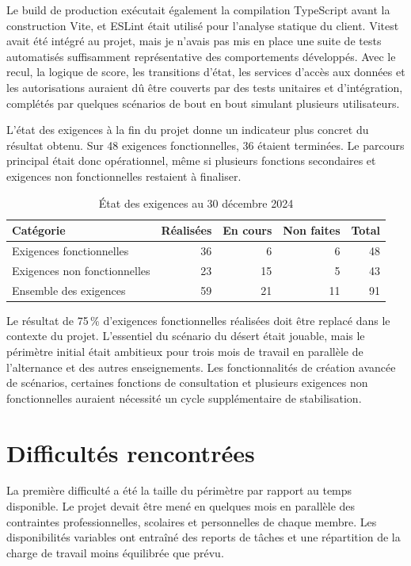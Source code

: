 Le build de production exécutait également la compilation TypeScript avant la construction Vite, et ESLint était utilisé pour l'analyse statique du client. Vitest avait été intégré au projet, mais je n'avais pas mis en place une suite de tests automatisés suffisamment représentative des comportements développés. Avec le recul, la logique de score, les transitions d'état, les services d'accès aux données et les autorisations auraient dû être couverts par des tests unitaires et d'intégration, complétés par quelques scénarios de bout en bout simulant plusieurs utilisateurs.

L'état des exigences à la fin du projet donne un indicateur plus concret du résultat obtenu. Sur 48 exigences fonctionnelles, 36 étaient terminées. Le parcours principal était donc opérationnel, même si plusieurs fonctions secondaires et exigences non fonctionnelles restaient à finaliser.

\begin{table}[H]
\centering
\begin{tabular}{p{5.2cm} r r r r}
\toprule
\textbf{Catégorie} & \textbf{Réalisées} & \textbf{En cours} & \textbf{Non faites} & \textbf{Total} \\
\midrule
Exigences fonctionnelles & 36 & 6 & 6 & 48 \\
Exigences non fonctionnelles & 23 & 15 & 5 & 43 \\
Ensemble des exigences & 59 & 21 & 11 & 91 \\
\bottomrule
\end{tabular}
\caption{État des exigences au 30 décembre 2024}
\label{tab:brise-glace-exigences}
\end{table}

Le résultat de 75\,\% d'exigences fonctionnelles réalisées doit être replacé dans le contexte du projet. L'essentiel du scénario du désert était jouable, mais le périmètre initial était ambitieux pour trois mois de travail en parallèle de l'alternance et des autres enseignements. Les fonctionnalités de création avancée de scénarios, certaines fonctions de consultation et plusieurs exigences non fonctionnelles auraient nécessité un cycle supplémentaire de stabilisation.

\section{Difficultés rencontrées}

La première difficulté a été la taille du périmètre par rapport au temps disponible. Le projet devait être mené en quelques mois en parallèle des contraintes professionnelles, scolaires et personnelles de chaque membre. Les disponibilités variables ont entraîné des reports de tâches et une répartition de la charge de travail moins équilibrée que prévu.

